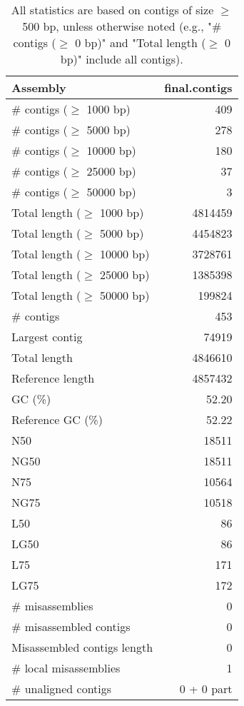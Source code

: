 \documentclass[12pt,a4paper]{article}
\begin{document}
\begin{table}[ht]
\begin{center}
\caption{All statistics are based on contigs of size $\geq$ 500 bp, unless otherwise noted (e.g., "\# contigs ($\geq$ 0 bp)" and "Total length ($\geq$ 0 bp)" include all contigs).}
\begin{tabular}{|l*{1}{|r}|}
\hline
Assembly & final.contigs \\ \hline
\# contigs ($\geq$ 1000 bp) & 409 \\ \hline
\# contigs ($\geq$ 5000 bp) & 278 \\ \hline
\# contigs ($\geq$ 10000 bp) & 180 \\ \hline
\# contigs ($\geq$ 25000 bp) & 37 \\ \hline
\# contigs ($\geq$ 50000 bp) & 3 \\ \hline
Total length ($\geq$ 1000 bp) & 4814459 \\ \hline
Total length ($\geq$ 5000 bp) & 4454823 \\ \hline
Total length ($\geq$ 10000 bp) & 3728761 \\ \hline
Total length ($\geq$ 25000 bp) & 1385398 \\ \hline
Total length ($\geq$ 50000 bp) & 199824 \\ \hline
\# contigs & 453 \\ \hline
Largest contig & 74919 \\ \hline
Total length & 4846610 \\ \hline
Reference length & 4857432 \\ \hline
GC (\%) & 52.20 \\ \hline
Reference GC (\%) & 52.22 \\ \hline
N50 & 18511 \\ \hline
NG50 & 18511 \\ \hline
N75 & 10564 \\ \hline
NG75 & 10518 \\ \hline
L50 & 86 \\ \hline
LG50 & 86 \\ \hline
L75 & 171 \\ \hline
LG75 & 172 \\ \hline
\# misassemblies & 0 \\ \hline
\# misassembled contigs & 0 \\ \hline
Misassembled contigs length & 0 \\ \hline
\# local misassemblies & 1 \\ \hline
\# unaligned contigs & 0 + 0 part \\ \hline

\end{tabular}
\end{center}
\end{table}
\end{document}
